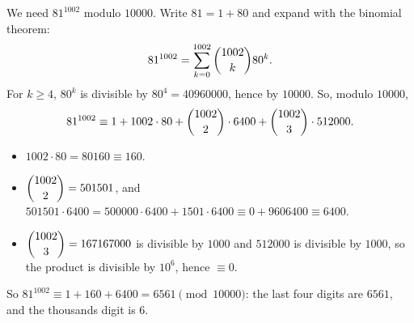 We need $81^{1002}$ modulo $10000$. Write $81=1+80$ and expand with the binomial theorem:
\[81^{1002}=\sum_{k=0}^{1002}\dbinom{1002}{k}80^k.\]
For $k\ge4$, $80^k$ is divisible by $80^4=40960000$, hence by $10000$. So, modulo $10000$,
\[81^{1002}\equiv1+1002\cdot80+\dbinom{1002}{2}\cdot6400+\dbinom{1002}{3}\cdot512000.\]
\begin{itemize}
\item $1002\cdot80=80160\equiv160$.
\item $\dbinom{1002}{2}=501501$, and $501501\cdot6400=500000\cdot6400+1501\cdot6400\equiv0+9606400\equiv6400$.
\item $\dbinom{1002}{3}=167167000$ is divisible by $1000$ and $512000$ is divisible by $1000$, so the product is divisible by $10^6$, hence $\equiv0$.
\end{itemize}
So $81^{1002}\equiv1+160+6400=6561\pmod{10000}$: the last four digits are $6561$, and the thousands digit is $\boxed{6}$.
